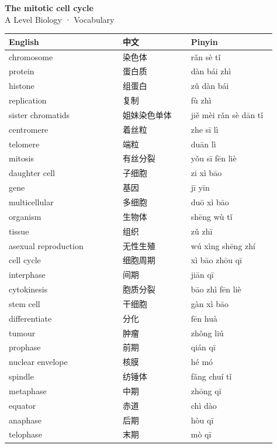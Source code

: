 \documentclass[11pt]{article}
\begin{document}
\begin{center}
  {\LARGE\bfseries The mitotic cell cycle}\\[0.35em]
  {\large A Level Biology · Vocabulary}
\end{center}
\vspace{0.6em}

\begin{longtable}{@{}p{0.40\linewidth}p{0.24\linewidth}p{0.30\linewidth}@{}}
\toprule
\textbf{English} & \textbf{中文} & \textbf{Pinyin} \\
\midrule
\endhead
\bottomrule
\endlastfoot
chromosome & 染色体 & rǎn sè tǐ \\
protein & 蛋白质 & dàn bái zhì \\
histone & 组蛋白 & zǔ dàn bái \\
replication & 复制 & fù zhì \\
sister chromatids & 姐妹染色单体 & jiě mèi rǎn sè dān tǐ \\
centromere & 着丝粒 & zhe sī lì \\
telomere & 端粒 & duān lì \\
mitosis & 有丝分裂 & yǒu sī fēn liè \\
daughter cell & 子细胞 & zi xì bāo \\
gene & 基因 & jī yīn \\
multicellular & 多细胞 & duō xì bāo \\
organism & 生物体 & shēng wù tǐ \\
tissue & 组织 & zǔ zhī \\
asexual reproduction & 无性生殖 & wú xìng shēng zhí \\
cell cycle & 细胞周期 & xì bāo zhōu qī \\
interphase & 间期 & jiān qī \\
cytokinesis & 胞质分裂 & bāo zhì fēn liè \\
stem cell & 干细胞 & gàn xì bāo \\
differentiate & 分化 & fēn huà \\
tumour & 肿瘤 & zhǒng liú \\
prophase & 前期 & qián qī \\
nuclear envelope & 核膜 & hé mó \\
spindle & 纺锤体 & fǎng chuí tǐ \\
metaphase & 中期 & zhōng qī \\
equator & 赤道 & chì dào \\
anaphase & 后期 & hòu qī \\
telophase & 末期 & mò qī \\
\end{longtable}
\end{document}
